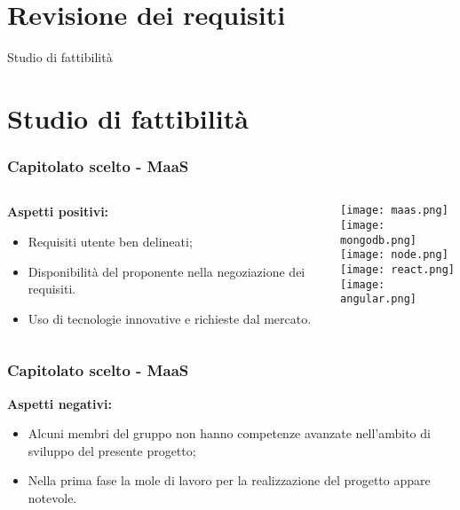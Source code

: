 \section{Revisione dei requisiti}
\begin{frame}
  \titlepage
\end{frame}

\begin{frame}

\begin{center}   \huge Studio di fattibilità \end{center}

\end{frame}

\section{Studio di fattibilità}
\begin{frame}
  \frametitle{Capitolato scelto - MaaS}
  \begin{columns}
    \begin{column}{0.4\textwidth}
      \par{\textbf{Aspetti positivi:}}
      \begin{itemize}
      \item Requisiti utente ben delineati;
      \item Disponibilità del proponente nella negoziazione dei requisiti.
      \item Uso di tecnologie innovative e richieste dal mercato.
      \end{itemize}
    \end{column}
    \begin{column}{0.4\textwidth}
      \texttt{[image: maas.png]}\\
      \texttt{[image: mongodb.png]}\\
      \texttt{[image: node.png]}\\
      \texttt{[image: react.png]}\\
      \texttt{[image: angular.png]}
    \end{column}
  \end{columns}
\end{frame}

\begin{frame}
  \frametitle{Capitolato scelto - MaaS}
  \par{\textbf{Aspetti negativi:}}
  \begin{itemize}
  \item Alcuni membri del gruppo non hanno competenze avanzate nell’ambito di sviluppo del presente progetto;
  \item Nella prima fase la mole di lavoro per la realizzazione del progetto appare notevole.
  \end{itemize}
\end{frame}

